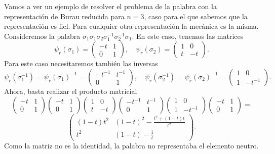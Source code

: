 \documentclass[TFG.tex]{subfiles}
\begin{document}
\begin{ej}
Vamos a ver un ejemplo de resolver el problema de la palabra con la representación de Burau reducida para $n=3$, caso para el que sabemos que la representación es fiel. Para cualquier otra representación la mecánica es la misma. Consideremos la palabra $\sigma_1\sigma_1\sigma_2\sigma_1^{-1}\sigma_2^{-1}\sigma_1$. En este caso, tenemos las matrices
\[
\psi_r(\sigma_1)=\begin{pmatrix}
-t&1 \\
0 & 1
\end{pmatrix},\quad \psi_r(\sigma_2)=\begin{pmatrix}
1&0 \\
t&-t
\end{pmatrix}.
\]
Para este caso necesitaremos también las inversas
\[
\psi_r(\sigma_1^{-1})=\psi_r(\sigma_1)^{-1}=\begin{pmatrix}
-t^{-1}&t^{-1} \\
0&1
\end{pmatrix},\quad \psi_r(\sigma_2^{-1})=\psi_r(\sigma_2)^{-1}=\begin{pmatrix}
1&0 \\
1&-t^{-1}
\end{pmatrix}.
\]
Ahora, basta realizar el producto matricial
\[
\begin{pmatrix}
-t&1 \\
0 & 1
\end{pmatrix}
\begin{pmatrix}
-t&1 \\
0 & 1
\end{pmatrix}\begin{pmatrix}
1&0 \\
t&-t
\end{pmatrix}\begin{pmatrix}
-t^{-1}&t^{-1} \\
0&1
\end{pmatrix}\begin{pmatrix}
1&0 \\
1&-t^{-1}
\end{pmatrix}\begin{pmatrix}
-t&1 \\
0 & 1
\end{pmatrix}=
\]
\[
\begin{pmatrix}
(1-t)t^2& (1-t)^2-\frac{t^2+(1-t)t}{t^2}\\
t^2& (1-t)-\frac{1}{t}
\end{pmatrix}.
\]
Como la matriz no es la identidad, la palabra no representaba el elemento neutro.
\end{ej}
\end{document}
